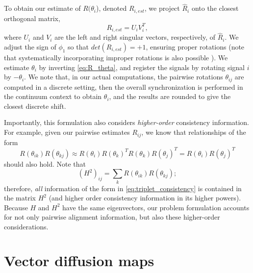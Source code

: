 %
To obtain our estimate of $R(\theta_i$), denoted $R_{i, est}$, we project $\hat{R}_i$ onto the closest orthogonal matrix,
\begin{equation} \label{eq:R_est}
R_{i, est} = U_i V_i^T,
\end{equation}
where $U_i$ and $V_i$ are the left and right singular vectors, respectively, of $\hat{R}_i$.
%
We adjust the sign of $\phi_1$ so that $det(R_{i, est}) = +1$, ensuring proper rotations 
(note that systematically incorporating improper rotations is also possible \citep{goemans1995improved, bandeira2013cheeger}).
%
We estimate $\theta_{i}$ by inverting \eqref{eq:R_theta}, and register the signals by rotating signal $i$ by $-\theta_i$.
%
We note that, in our actual computations, the pairwise rotations $\theta_{ij}$ are computed in a discrete setting, then the overall
synchronization is performed in the continuum context to obtain $\theta_i$, and the results are rounded to give the closest
discrete shift.

Importantly, this formulation also considers {\it higher-order} consistency information.
%
For example, given our pairwise estimates $R_{ij}$, we know that relationships of the form
\begin{equation} \label{eq:triplet_consistency}
R(\theta_{ik}) R(\theta_{kj}) \approx R(\theta_i) R(\theta_k)^T R(\theta_k) R(\theta_j)^T = R(\theta_i) R(\theta_j)^T
\end{equation}
should also hold.
%
Note that
\begin{equation}
(H^2)_{ij} = \sum_k R(\theta_{ik}) R(\theta_{kj});
\end{equation}
therefore, {\it all} information of the form in \eqref{eq:triplet_consistency} is contained in the matrix $H^2$ (and higher order
consistency information in its higher powers).
%
Because $H$ and $H^2$ have the same eigenvectors, our problem formulation accounts for not only pairwise alignment information, but also these higher-order considerations.

\section{Vector diffusion maps}

